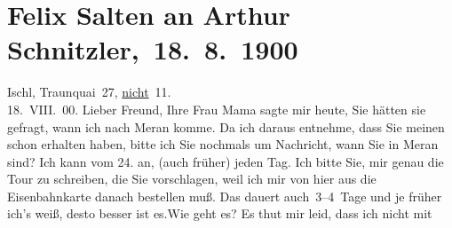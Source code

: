 

         
         \renewcommand{\erwaehntePersonen}{Personen: Caroline Kotter, Ottmar Peter Kotter, Elisabeth Kotter, Leopoldine Müller, Felix Salten, Louise Schnitzler}
         \renewcommand{\erwaehnteOrte}{Orte: Bad Ischl, Meran, Schruns, Thusis, Traunkai}
         \renewcommand{\erwaehnteWerke}{}
               \section[ Felix Salten an Arthur Schnitzler, 18. 8. 1900]{ Felix Salten an Arthur Schnitzler, 18. 8. 1900}\nopagebreak{}\rehead{ }\begin{ledgroupsized}[t]{13cm}\normalsize\beginnumbering{} \toendnotes[C]{\smallbreak\pagebreak[2]} 
\toendnotes[C]{\smallbreak}\pstart
           \raggedleft{}{\pb}Ischl, Traunquai 27, \uline{nicht} 11. {\\}18. VIII. 00.\pend
           \pstart
           Lieber Freund, Ihre Frau Mama sagte mir heute, Sie
               hätten sie gefragt, wann ich nach Meran komme.
               Da ich daraus entnehme, dass Sie meinen \label{K_L03311-1v}\label{K_L03311-1h} schon erhalten haben, bitte ich Sie nochmals um Nachricht, wann Sie in Meran sind? Ich kann vom
                  24. an, (auch früher) jeden Tag. Ich bitte Sie, mir
               genau die Tour zu schreiben, die Sie vorschlagen, weil ich mir von hier aus die
               Eisenbahnkarte danach bestellen muß. Das dauert auch 3–4 Tage und je früher ich’s
               weiß, desto besser ist es.\hspace*{2em}Wie geht es? Es thut mir leid, dass ich nicht mit

\end{ledgroupsized}
